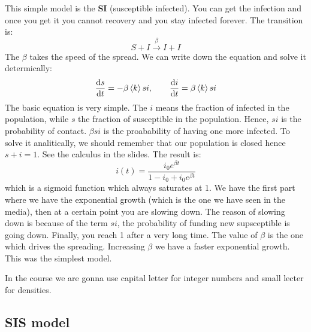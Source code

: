 \documentclass[../main/main.tex]{subfiles}
\begin{document}
This simple model is the \textbf{SI} (susceptible infected). You can get the infection and once you get it you cannot recovery and you stay infected forever.
The transition is:
\begin{equation*}
  S + I \overset{\beta }{\rightarrow} I + I
\end{equation*}
The \( \beta  \) takes the speed of the spread. We can write down the equation and solve it determically:
\begin{equation*}
  \dv{s}{t} = - \beta \expval{k} si, \qquad \dv{i}{t} = \beta \expval{k} si
\end{equation*}
The basic equation is very simple. The \( i \) means the fraction of infected in the population, while \( s \) the fraction of susceptible in the population. Hence, \( si \) is the probability of contact. \( \beta  s i \) is the proabability of having one more infected.
To solve it analitically, we should remember that our population is closed hence \( s+i=1 \). See the calculus in the slides.
The result is:
\begin{equation*}
  i(t) = \frac{i_0 e^{\beta t} }{1-i_0 + i_0 e^{\beta t} }
\end{equation*}
which is a sigmoid function which always saturates at 1. We have the first part where we have the exponential growth (which is the one we have seen in the media), then at a certain point you are slowing down. The reason of slowing down is because of the term \( s i \), the probability of funding new supsceptible is going down. Finally, you reach 1 after a very long time. The value of \( \beta  \) is the one which drives the spreading. Increasing \( \beta  \) we have a faster exponential growth.
This was the simplest model.

\begin{remark}
In the course we are gonna use capital letter for integer numbers and small lecter for densities.
\end{remark}

\subsection{SIS model}
\end{document}
